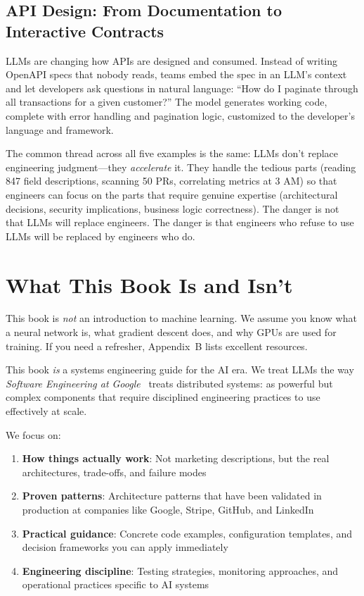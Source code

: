 \subsection{API Design: From Documentation to Interactive Contracts}

LLMs are changing how APIs are designed and consumed. Instead of writing OpenAPI specs that nobody reads, teams embed the spec in an LLM's context and let developers ask questions in natural language: ``How do I paginate through all transactions for a given customer?'' The model generates working code, complete with error handling and pagination logic, customized to the developer's language and framework.

\begin{keytakeaway}
The common thread across all five examples is the same: LLMs don't replace engineering judgment---they \emph{accelerate} it. They handle the tedious parts (reading 847 field descriptions, scanning 50 PRs, correlating metrics at 3 AM) so that engineers can focus on the parts that require genuine expertise (architectural decisions, security implications, business logic correctness). The danger is not that LLMs will replace engineers. The danger is that engineers who refuse to use LLMs will be replaced by engineers who do.
\end{keytakeaway}



\section{What This Book Is and Isn't}

This book is \emph{not} an introduction to machine learning. We assume you know what a neural network is, what gradient descent does, and why GPUs are used for training. If you need a refresher, Appendix~B lists excellent resources.

This book \emph{is} a systems engineering guide for the AI era. We treat LLMs the way \emph{Software Engineering at Google}~\cite{winters2020swe} treats distributed systems: as powerful but complex components that require disciplined engineering practices to use effectively at scale.

We focus on:

\begin{enumerate}[leftmargin=*]
  \item \textbf{How things actually work}: Not marketing descriptions, but the real architectures, trade-offs, and failure modes
  \item \textbf{Proven patterns}: Architecture patterns that have been validated in production at companies like Google, Stripe, GitHub, and LinkedIn
  \item \textbf{Practical guidance}: Concrete code examples, configuration templates, and decision frameworks you can apply immediately
  \item \textbf{Engineering discipline}: Testing strategies, monitoring approaches, and operational practices specific to AI systems
\end{enumerate}

